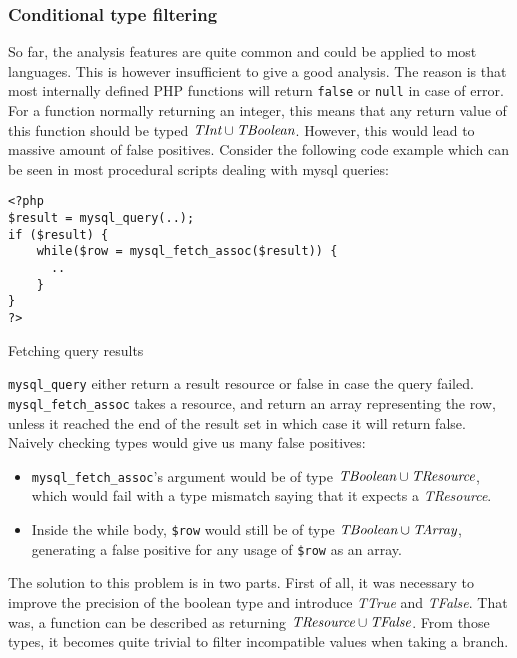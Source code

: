 \documentclass[a4paper]{article}
\begin{document}
\subsubsection{Conditional type filtering}
So far, the analysis features are quite common and could be applied to most
languages. This is however insufficient to give a good analysis. The reason is
that most internally defined PHP functions will return \verb/false/ or
\verb/null/ in case of error. For a function normally returning an integer,
this means that any return value of this function should be typed
$\emph{TInt} \cup \emph{TBoolean}$. However, this would lead to massive amount of false
positives. Consider the following code example which can be seen in most
procedural scripts dealing with mysql queries:

\begin{listing}
  \begin{verbatim}
<?php
$result = mysql_query(..);
if ($result) {
    while($row = mysql_fetch_assoc($result)) {
      ..
    }
}
?>
  \end{verbatim}
  \caption{Fetching query results}
\end{listing}

\verb/mysql_query/ either return a result resource or false in case the query
failed. \verb/mysql_fetch_assoc/ takes a resource, and return an array
representing the row, unless it reached the end of the result set in which case
it will return false. Naively checking types would give us many false
positives:
\begin{itemize}
  \item \verb/mysql_fetch_assoc/'s argument would be of type
    $\emph{TBoolean} \cup \emph{TResource}$, which would fail with a type mismatch saying
    that it expects a \emph{TResource}.
  \item Inside the while body, \verb/$row/ would still be of type $\emph{TBoolean}
    \cup \emph{TArray}$, generating a false positive for any usage of \verb/$row/ as
    an array.
\end{itemize}

The solution to this problem is in two parts. First of all, it was necessary to
improve the precision of the boolean type and introduce \emph{TTrue} and
\emph{TFalse}.  That was, a function can be described as returning
$\emph{TResource} \cup \emph{TFalse}$.  From those types, it becomes quite
trivial to filter incompatible values when taking a branch.
\end{document}
